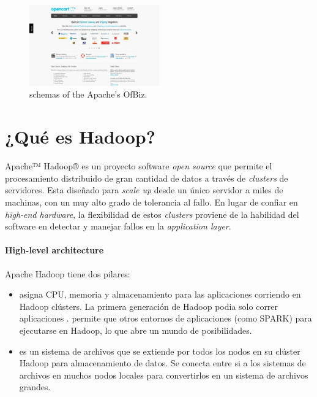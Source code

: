 \begin{figure}[h!]
	\centering
	\includegraphics[width=0.5\textwidth]{figuras/apendice/openCartWebsite.jpg}
	\caption{schemas of the Apache's OfBiz.}
	\label{ap:figure:catalog_ofbiz}
\end{figure}

\chapter{¿Qué es Hadoop? \cite{online_hadoop_description}}\label{ap:apendice_hadoop_description}
Apache™ Hadoop® es un proyecto software \textit{open source} que permite el procesamiento distribuido de gran cantidad de datos a través de \textit{clusters} de servidores. Esta diseñado para \textit{scale up} desde un único servidor a miles de machinas, con un muy alto grado de tolerancia al fallo. En lugar de confiar en \textit{high-end hardware}, la flexibilidad de estos \textit{clusters} proviene de la habilidad del software en detectar y manejar fallos en la \textit{application layer}.

\subsubsection*{High-level architecture} 
Apache Hadoop tiene dos pilares:

\begin{itemize}
	\item {} asigna CPU, memoria y almacenamiento para las aplicaciones corriendo en Hadoop clústers. La primera generación de Hadoop podia solo correr aplicaciones .  permite que otros entornos de aplicaciones (como SPARK) para ejecutarse en Hadoop, lo que abre un mundo de posibilidades.
	
	\item {} es un sistema de archivos que se extiende por todos los nodos en su clúster Hadoop para almacenamiento de datos. Se conecta entre si a los sistemas de archivos en muchos nodos locales para convertirlos en un sistema de archivos grandes.
\end{itemize}

